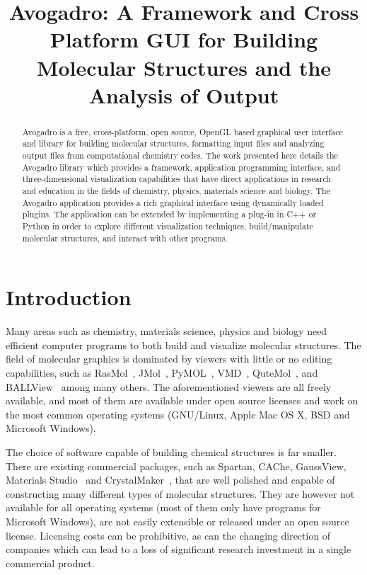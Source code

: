 \documentclass{article}
\title{Avogadro: A Framework and Cross Platform GUI for Building Molecular Structures and the Analysis of Output}
\begin{document}
\maketitle

\begin{abstract}

Avogadro is a free, cross-platform, open source, OpenGL based graphical user interface and library for building molecular structures, formatting input files and analyzing output files from computational chemistry codes. The work presented here details the Avogadro library which provides a framework, application programming interface, and three-dimensional visualization capabilities that have direct applications in research and education in the fields of chemistry, physics, materials science and biology. The Avogadro application provides a rich graphical interface using dynamically loaded plugins. The application can be extended by implementing a plug-in in C++ or Python in order to explore different visualization techniques, build/manipulate molecular structures, and interact with other programs.

\end{abstract}

\section{Introduction}

Many areas such as chemistry, materials science, physics and biology need efficient computer programs to both build and visualize molecular structures. The field of molecular graphics is dominated by viewers with little or no editing capabilities, such as RasMol~\cite{RasMol}, JMol~\cite{JMol}, PyMOL~\cite{PyMOL}, VMD~\cite{VMD}, QuteMol~\cite{QuteMol}, and BALLView~\cite{BALLView} among many others. The aforementioned viewers are all freely available, and most of them are available under open source licenses and work on the most common operating systems (GNU/Linux, Apple Mac OS X, BSD and Microsoft Windows).

The choice of software capable of building chemical structures is far smaller. There are existing commercial packages, such as Spartan, CAChe, GaussView, Materials Studio~\cite{Accelrys} and CrystalMaker~\cite{CrystalMaker}, that are well polished and capable of constructing many different types of molecular structures. They are however not available for all operating systems (most of them only have programs for Microsoft Windows), are not easily extensible or released under an open source license. Licensing costs can be prohibitive, as can the changing direction of companies which can lead to a loss of significant research investment in a single commercial product.
\end{document}

